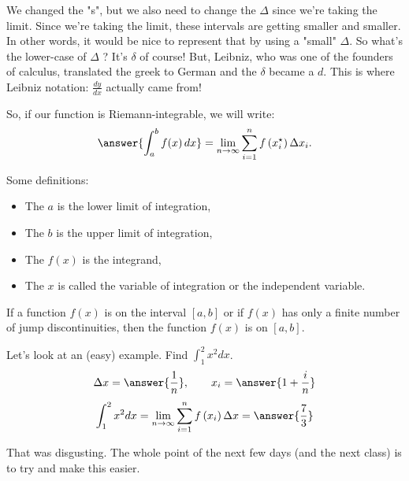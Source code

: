 \documentclass{ximera}
\begin{document}
We changed the "s", but we also need to change the $\Delta$ since we're taking the limit. Since we're taking the limit, these intervals are getting smaller and smaller. In other words, it would be nice to represent that by using a "small" $\Delta$. So what's the lower-case of $\Delta$ ? It's $\delta$ of course! But, Leibniz, who was one of the founders of calculus, translated the greek to German and the $\delta$ became a $d$. This is where Leibniz notation: $\frac{d y}{d x}$ actually came from!

So, if our function is Riemann-integrable, we will write:
\[
\answer{\int_{a}^{b} f(x)\,dx} = \lim _{n \rightarrow \infty} \sum_{i=1}^{n} f\left(x_{i}^{\star}\right) \Delta x_{i} .
\]

Some definitions:
\begin{itemize}
  \item The $a$ is the lower limit of integration,
  \item The $b$ is the upper limit of integration,
  \item The $f(x)$ is the integrand,
  \item The $x$ is called the variable of integration or the independent variable.
\end{itemize}

\begin{theorem}\label{theorem:12-10}
If a function $f(x)$ is  on the interval $[a, b]$ or if $f(x)$ has only a finite number of jump discontinuities, then the function $f(x)$ is  on $[a, b]$.
\end{theorem}

\begin{example}\label{example:12-11}
Let's look at an (easy) example. Find $\int_{1}^{2} x^{2} d x$.
\[
\Delta x=\answer{\frac{1}{n}}, \qquad x_{i}=\answer{1+\frac{i}{n}}
\]
\[
\int_{1}^{2} x^{2} d x=\lim _{n \rightarrow \infty} \sum_{i=1}^{n} f\left(x_{i}\right) \Delta x=\answer{\frac{7}{3}}
\]
\end{example}

That was disgusting. The whole point of the next few days (and the next class) is to try and make this easier.
\end{document}
